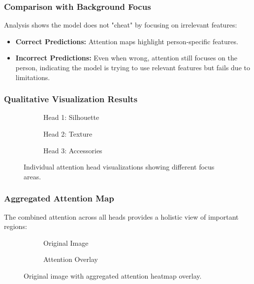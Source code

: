 \documentclass[a4paper,12pt]{article}
\begin{document}
\subsubsection*{Comparison with Background Focus}
Analysis shows the model does not "cheat" by focusing on irrelevant features:

\begin{itemize}
    \item \textbf{Correct Predictions:} Attention maps highlight person-specific features.
    \item \textbf{Incorrect Predictions:} Even when wrong, attention still focuses on the person, indicating the model is trying to use relevant features but fails due to limitations.
\end{itemize}

\subsubsection*{Qualitative Visualization Results}
\begin{figure}[H]
    \centering
    \begin{subfigure}[b]{0.32\textwidth}
        \centering
        \caption{Head 1: Silhouette}
    \end{subfigure}
    \hfill
    \begin{subfigure}[b]{0.32\textwidth}
        \centering
        \caption{Head 2: Texture}
    \end{subfigure}
    \hfill
    \begin{subfigure}[b]{0.32\textwidth}
        \centering
        \caption{Head 3: Accessories}
    \end{subfigure}
    \caption{Individual attention head visualizations showing different focus areas.}
    \label{fig:attention_heads}
\end{figure}

\subsubsection*{Aggregated Attention Map}
The combined attention across all heads provides a holistic view of important regions:

\begin{figure}[H]
    \centering
    \begin{subfigure}[b]{0.45\textwidth}
        \centering
        \caption{Original Image}
    \end{subfigure}
    \hfill
    \begin{subfigure}[b]{0.45\textwidth}
        \centering
        \caption{Attention Overlay}
    \end{subfigure}
    \caption{Original image with aggregated attention heatmap overlay.}
    \label{fig:attention_overlay}
\end{figure}
\end{document}
